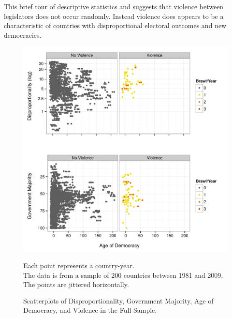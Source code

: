 \documentclass[a4paper]{article}\usepackage{graphicx, color}
\newenvironment{knitrout}{}{} %
\begin{document}
This brief tour of descriptive statistics and  suggests that violence between legislators does not occur randomly. Instead violence does appears to be a characteristic of countries with disproportional electoral outcomes and new democracies.

\begin{figure}[t]
    \caption{Scatterplots of Disproportionality, Government Majority, Age of Democracy, and Violence in the Full Sample.}  
    \label{framework_empirical}
    \begin{center}

\begin{knitrout}
\color{fgcolor}
\includegraphics[width=0.8\linewidth]{figure/FrameworkEmpirical} 

\end{knitrout}

    \end{center}
    \begin{singlespace}
        {\scriptsize{Each point represents a country-year. \\ The data is from a sample of 200 countries between 1981 and 2009. The points are jittered horizontally.}}
    \end{singlespace}

\end{figure}

\end{document}
